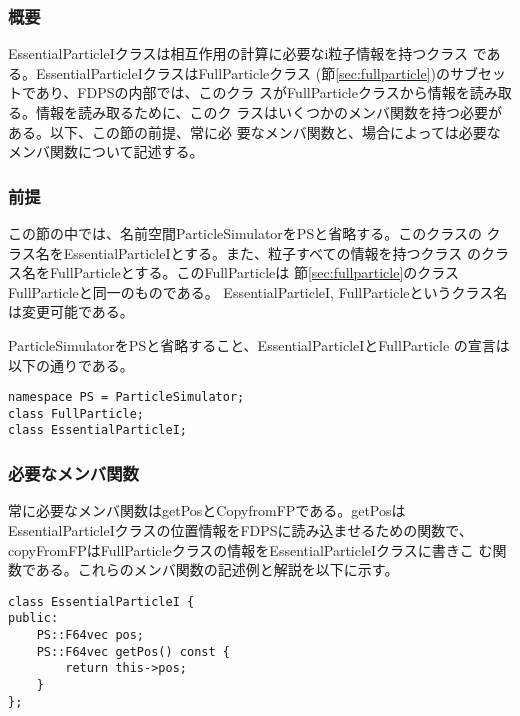 \subsubsection{概要}

EssentialParticleIクラスは相互作用の計算に必要なi粒子情報を持つクラス
である。EssentialParticleIクラスはFullParticleクラス
(節\ref{sec:fullparticle})のサブセットであり、FDPSの内部では、このクラ
スがFullParticleクラスから情報を読み取る。情報を読み取るために、このク
ラスはいくつかのメンバ関数を持つ必要がある。以下、この節の前提、常に必
要なメンバ関数と、場合によっては必要なメンバ関数について記述する。

\subsubsection{前提}

この節の中では、名前空間ParticleSimulatorをPSと省略する。このクラスの
クラス名をEssentialParticleIとする。また、粒子すべての情報を持つクラス
のクラス名をFullParticleとする。このFullParticleは
節\ref{sec:fullparticle}のクラスFullParticleと同一のものである。
EssentialParticleI, FullParticleというクラス名は変更可能である。

ParticleSimulatorをPSと省略すること、EssentialParticleIとFullParticle
の宣言は以下の通りである。
\begin{screen}
\begin{verbatim}
namespace PS = ParticleSimulator;
class FullParticle;
class EssentialParticleI;
\end{verbatim}
\end{screen}

\subsubsection{必要なメンバ関数}


常に必要なメンバ関数はgetPosとCopyfromFPである。getPosは
EssentialParticleIクラスの位置情報をFDPSに読み込ませるための関数で、
copyFromFPはFullParticleクラスの情報をEssentialParticleIクラスに書きこ
む関数である。これらのメンバ関数の記述例と解説を以下に示す。


\begin{screen}
\begin{verbatim}
class EssentialParticleI {
public:
    PS::F64vec pos;
    PS::F64vec getPos() const {
        return this->pos;
    }
};
\end{verbatim}
\end{screen}

